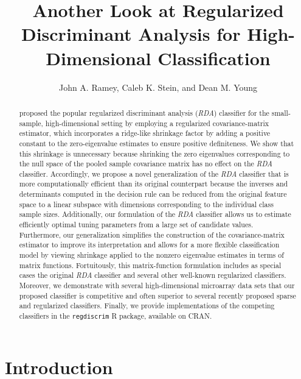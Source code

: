 \documentclass[11pt]{article}
\title{Another Look at Regularized Discriminant Analysis for High-Dimensional Classification}
\author{John A. Ramey, Caleb K. Stein, and Dean M. Young}
\begin{document}
\newtheorem{cor}{Corollary}
\newtheorem{lemma}{Lemma}
\newtheorem{thm}{Theorem}


\doublespacing

\maketitle

\begin{abstract}
\cite{Friedman:1989tm} proposed the popular regularized discriminant analysis (\emph{RDA}) classifier for the small-sample, high-dimensional setting by employing a regularized covariance-matrix estimator, which incorporates a ridge-like shrinkage factor by adding a positive constant to the zero-eigenvalue estimates to ensure positive definiteness. We show that this shrinkage is unnecessary because shrinking the zero eigenvalues corresponding to the null space of the pooled sample covariance matrix has no effect on the \emph{RDA} classifier. Accordingly, we propose a novel generalization of the \emph{RDA} classifier that is more computationally efficient than its original counterpart because the inverses and determinants computed in the decision rule can be reduced from the original feature space to a linear subspace with dimensions corresponding to the individual class sample sizes. Additionally, our formulation of the \emph{RDA} classifier allows us to estimate efficiently optimal tuning parameters from a large set of candidate values. Furthermore, our generalization simplifies the construction of the covariance-matrix estimator to improve its interpretation and allows for a more flexible classification model by viewing shrinkage applied to the nonzero eigenvalue estimates in terms of matrix functions. Fortuitously, this matrix-function formulation includes as special cases the original \emph{RDA} classifier and several other well-known regularized classifiers. Moreover, we demonstrate with several high-dimensional microarray data sets that our proposed classifier is competitive and often superior to several recently proposed sparse and regularized classifiers. Finally, we provide implementations of the competing classifiers in the {\tt regdiscrim} R package, available on CRAN.
\end{abstract}

\section{Introduction}
\end{document}
